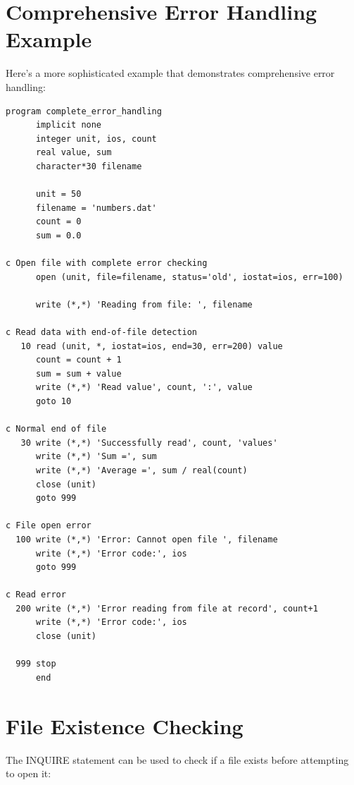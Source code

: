 \section{Comprehensive Error Handling Example}

Here's a more sophisticated example that demonstrates comprehensive error handling:

\begin{lstlisting}[style=fortran77]
      program complete_error_handling
      implicit none
      integer unit, ios, count
      real value, sum
      character*30 filename
      
      unit = 50
      filename = 'numbers.dat'
      count = 0
      sum = 0.0
      
c Open file with complete error checking
      open (unit, file=filename, status='old', iostat=ios, err=100)
      
      write (*,*) 'Reading from file: ', filename
      
c Read data with end-of-file detection
   10 read (unit, *, iostat=ios, end=30, err=200) value
      count = count + 1
      sum = sum + value
      write (*,*) 'Read value', count, ':', value
      goto 10
      
c Normal end of file
   30 write (*,*) 'Successfully read', count, 'values'
      write (*,*) 'Sum =', sum
      write (*,*) 'Average =', sum / real(count)
      close (unit)
      goto 999
      
c File open error
  100 write (*,*) 'Error: Cannot open file ', filename
      write (*,*) 'Error code:', ios
      goto 999
      
c Read error
  200 write (*,*) 'Error reading from file at record', count+1
      write (*,*) 'Error code:', ios
      close (unit)
      
  999 stop
      end
\end{lstlisting}

\section{File Existence Checking}

The INQUIRE statement can be used to check if a file exists before attempting to open it:

